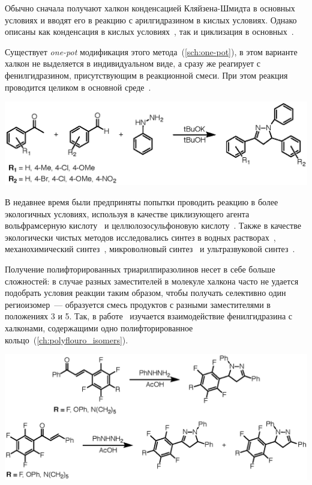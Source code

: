 Обычно сначала получают халкон конденсацией Кляйзена-Шмидта в основных условиях и вводят его в реакцию с арилгидразином в кислых условиях.
Однако описаны как конденсация в кислых условиях~\cite{Wang2010, Nielsen}, так и циклизация в основных~\cite{Munawar2008, Neudorfer2014, Manyem2007, Patel2004, Singh2014}.

Существует \emph{one-pot} модификация этого метода~(\ref{sch:one-pot}), в этом варианте халкон не выделяется в индивидуальном виде, а сразу же реагирует с фенилгидразином, присутствующим в реакционной смеси.
При этом реакция проводится целиком в основной среде~\cite{Farooq2020}.

\begin{scheme}[h!]
    \centering
    \includegraphics{sections/literature/img/one-pot.eps}
    \caption{}
    \label{sch:one-pot}
\end{scheme}

В недавнее время были предприняты попытки проводить реакцию в более экологичных условиях, используя в качестве циклизующего агента вольфрамсерную кислоту~\cite{Rahmatzadeh2015} и целлюлозосульфоновую кислоту~\cite{Daneshfar2015}.
Также в качестве экологически чистых методов исследовались синтез в водных растворах~\cite{Markovic2015}, механохимический синтез~\cite{Zangade2013}, микроволновый синтез~\cite{Adhikari2012} и ультразвуковой синтез~\cite{Shelke2012}.

Получение полифторированных триарилпиразолинов несет в себе больше сложностей: в случае разных заместителей в молекуле халкона часто не удается подобрать условия реакции таким образом, чтобы получать селективно один региоизомер~--- образуется смесь продуктов с разными заместителями в положениях 3 и 5.
Так, в работе~\cite{2010} изучается взаимодействие фенилгидразина с халконами, содержащими одно полифторированное кольцо~(\ref{ch:polyflouro_isomers}).

\begin{scheme}[h!]
    \centering
    \includegraphics{sections/literature/img/polyflouro_isomers.eps}
    \caption{}
    \label{sch:polyflouro_isomers}
\end{scheme}

